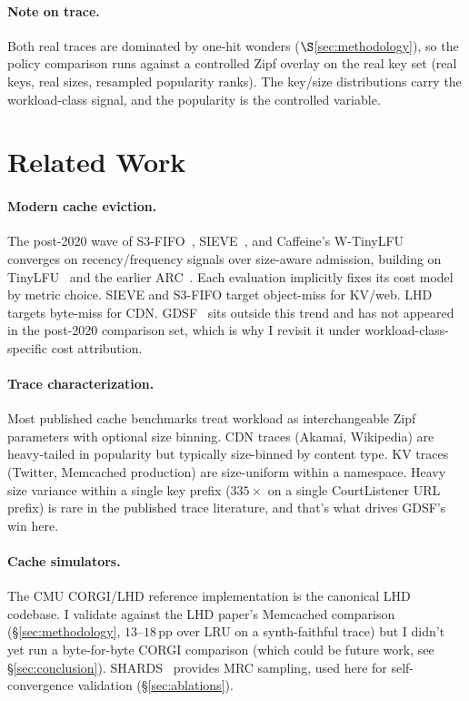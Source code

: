 \documentclass[letterpaper,twocolumn,10pt]{article}
\begin{document}
\paragraph{Note on trace.} Both real traces are dominated by one-hit
wonders ($\S$\ref{sec:methodology}), so the policy comparison runs
against a controlled Zipf overlay on the real key set (real keys,
real sizes, resampled popularity ranks). The key/size distributions
carry the workload-class signal, and the popularity is the
controlled variable.
\section{Related Work}\label{sec:related}
\paragraph{Modern cache eviction.} The post-2020 wave of
S3-FIFO~\cite{yang2023fifo}, SIEVE~\cite{zhang2024sieve}, and
Caffeine's W-TinyLFU~\cite{caffeine2024} converges on
recency/frequency signals over size-aware admission, building on
TinyLFU~\cite{einziger2017tinylfu} and the earlier
ARC~\cite{megiddo2003arc}. Each evaluation implicitly fixes its cost
model by metric choice. SIEVE and S3-FIFO target object-miss for
KV/web. LHD~\cite{beckmann2018lhd} targets byte-miss for CDN.
GDSF~\cite{cherkasova1998gdsf} sits outside this trend and has not
appeared in the post-2020 comparison set, which is why I revisit it under workload-class-specific cost attribution.
\paragraph{Trace characterization.} Most published cache benchmarks
treat workload as interchangeable Zipf parameters with optional size
binning. CDN traces (Akamai, Wikipedia) are heavy-tailed in
popularity but typically size-binned by content type. KV traces
(Twitter, Memcached production) are size-uniform within a namespace.
Heavy size variance within a single key prefix ($335\times$ on a
single CourtListener URL prefix) is rare in the published trace
literature, and that's what drives GDSF's win here.
\paragraph{Cache simulators.} The CMU CORGI/LHD reference
implementation is the canonical LHD codebase. I validate
against the LHD paper's Memcached comparison (\S\ref{sec:methodology},
$13$--$18$\,pp over LRU on a synth-faithful trace) but I didn't yet
run a byte-for-byte CORGI comparison (which could be future work, see
\S\ref{sec:conclusion}). SHARDS~\cite{waldspurger2015shards} provides
MRC sampling, used here for self-convergence validation
(\S\ref{sec:ablations}).
\end{document}

